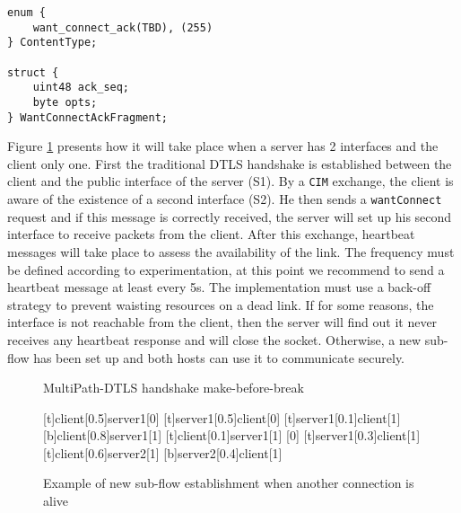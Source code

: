 \begin{lstlisting}[caption= wantConnectAck message, label=lst:WantConnectAck]
enum {
    want_connect_ack(TBD), (255)
} ContentType;

struct {
    uint48 ack_seq;
    byte opts;
} WantConnectAckFragment;
\end{lstlisting}

Figure \ref{fig:Handshake1} presents how it will take place when a server has 2 interfaces and the client only one. First the traditional DTLS handshake is established between the client and the public interface of the server (S1). By a \texttt{CIM} exchange, the client is aware of the existence of a second interface (S2). He then sends a \texttt{wantConnect} request and if this message is correctly received, the server will set up his second interface to receive packets from the client. After this exchange, heartbeat messages will take place to assess the availability of the link. The frequency must be defined according to experimentation, at this point we recommend to send a heartbeat message at least every 5s. The implementation must use a back-off strategy to prevent waisting resources on a dead link. If for some reasons, the interface is not reachable from the client, then the server will find out it never receives any heartbeat response and will close the socket. Otherwise, a new sub-flow has been set up and both hosts can use it to communicate securely. 


\begin{figure}[!h]
\centering
\begin{msc}[r]{MultiPath-DTLS handshake make-before-break}

\setlength{\instfootheight}{0em}
\setlength{\instheadheight}{0em}
\setlength{\instdist}{0.33\linewidth}
\setlength{\levelheight}{3em}


[t]{client}[0.5]{server1}[0]
\nextlevel
{}[t]{server1}[0.5]{client}[0]
\nextlevel
{}[t]{server1}[0.1]{client}[1]
\nextlevel
{}[b]{client}[0.8]{server1}[1]
\nextlevel[2]
[t]{client}[0.1]{server1}[1]
\nextlevel
{}
[0]
[t]{server1}[0.3]{client}[1]
\nextlevel
{}
\nextlevel
{}[t]{client}[0.6]{server2}[1]
\nextlevel
{}[b]{server2}[0.4]{client}[1]
\nextlevel[2]

\end{msc}
\caption{Example of new sub-flow establishment when another connection is alive}
\label{fig:Handshake1}
\end{figure}

